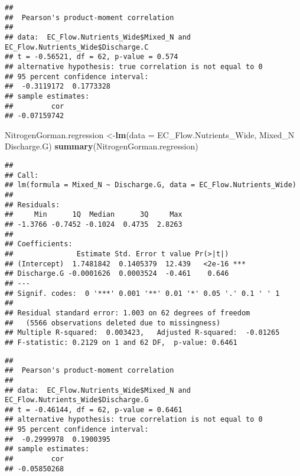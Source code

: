 \documentclass[]{article}
\newenvironment{Shaded}{\begin{snugshade}}{\end{snugshade}}
\newcommand{\CommentTok}[1]{\textcolor[rgb]{0.56,0.35,0.01}{\textit{#1}}}
\newcommand{\DataTypeTok}[1]{\textcolor[rgb]{0.13,0.29,0.53}{#1}}
\newcommand{\KeywordTok}[1]{\textcolor[rgb]{0.13,0.29,0.53}{\textbf{#1}}}
\newcommand{\NormalTok}[1]{#1}
\newcommand{\OperatorTok}[1]{\textcolor[rgb]{0.81,0.36,0.00}{\textbf{#1}}}
\newcommand{\StringTok}[1]{\textcolor[rgb]{0.31,0.60,0.02}{#1}}
\begin{document}
\begin{verbatim}
## 
##  Pearson's product-moment correlation
## 
## data:  EC_Flow.Nutrients_Wide$Mixed_N and EC_Flow.Nutrients_Wide$Discharge.C
## t = -0.56521, df = 62, p-value = 0.574
## alternative hypothesis: true correlation is not equal to 0
## 95 percent confidence interval:
##  -0.3119172  0.1773328
## sample estimates:
##         cor 
## -0.07159742
\end{verbatim}

\begin{Shaded}
\begin{Highlighting}[]
\NormalTok{NitrogenGorman.regression <-}\KeywordTok{lm}\NormalTok{(}\DataTypeTok{data =}\NormalTok{ EC_Flow.Nutrients_Wide, Mixed_N }\OperatorTok{~}\StringTok{ }\NormalTok{Discharge.G)}
\KeywordTok{summary}\NormalTok{(NitrogenGorman.regression)}
\end{Highlighting}
\end{Shaded}

\begin{verbatim}
## 
## Call:
## lm(formula = Mixed_N ~ Discharge.G, data = EC_Flow.Nutrients_Wide)
## 
## Residuals:
##     Min      1Q  Median      3Q     Max 
## -1.3766 -0.7452 -0.1024  0.4735  2.8263 
## 
## Coefficients:
##               Estimate Std. Error t value Pr(>|t|)    
## (Intercept)  1.7481842  0.1405379  12.439   <2e-16 ***
## Discharge.G -0.0001626  0.0003524  -0.461    0.646    
## ---
## Signif. codes:  0 '***' 0.001 '**' 0.01 '*' 0.05 '.' 0.1 ' ' 1
## 
## Residual standard error: 1.003 on 62 degrees of freedom
##   (5566 observations deleted due to missingness)
## Multiple R-squared:  0.003423,   Adjusted R-squared:  -0.01265 
## F-statistic: 0.2129 on 1 and 62 DF,  p-value: 0.6461
\end{verbatim}

\begin{Shaded}
\end{Shaded}

\begin{verbatim}
## 
##  Pearson's product-moment correlation
## 
## data:  EC_Flow.Nutrients_Wide$Mixed_N and EC_Flow.Nutrients_Wide$Discharge.G
## t = -0.46144, df = 62, p-value = 0.6461
## alternative hypothesis: true correlation is not equal to 0
## 95 percent confidence interval:
##  -0.2999978  0.1900395
## sample estimates:
##         cor 
## -0.05850268
\end{verbatim}
\end{document}
